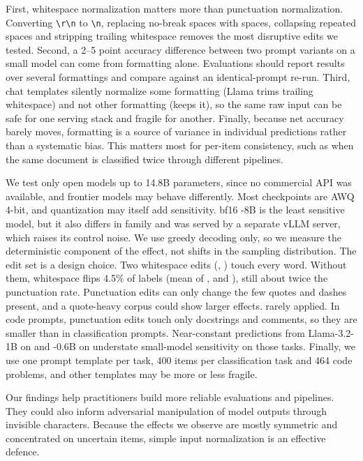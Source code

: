 First, whitespace normalization matters more than punctuation normalization. Converting \texttt{\textbackslash r\textbackslash n} to \texttt{\textbackslash n}, replacing no-break spaces with spaces, collapsing repeated spaces and stripping trailing whitespace removes the most disruptive edits we tested.
Second, a 2--5 point accuracy difference between two prompt variants on a small model can come from formatting alone. Evaluations should report results over several formattings and compare against an identical-prompt re-run.
Third, chat templates silently normalize some formatting (Llama trims trailing whitespace) and not other formatting (\qwentwo keeps it), so the same raw input can be safe for one serving stack and fragile for another.
Finally, because net accuracy barely moves, formatting is a source of variance in individual predictions rather than a systematic bias. This matters most for per-item consistency, such as when the same document is classified twice through different pipelines.

We test only open models up to 14.8B parameters, since no commercial API was available, and frontier models may behave differently.
Most checkpoints are AWQ 4-bit, and quantization may itself add sensitivity. bf16 \qwenthree-8B is the least sensitive model, but it also differs in family and was served by a separate vLLM server, which raises its control noise.
We use greedy decoding only, so we measure the deterministic component of the effect, not shifts in the sampling distribution.
The edit set is a design choice. Two whitespace edits (, ) touch every word. Without them, whitespace flips 4.5\% of labels (mean of ,  and ), still about twice the punctuation rate.
Punctuation edits can only change the few quotes and dashes present, and a quote-heavy corpus could show larger effects.  rarely applied.
In code prompts, punctuation edits touch only docstrings and comments, so they are smaller than in classification prompts.
Near-constant predictions from Llama-3.2-1B on \boolq and \qwenthree-0.6B on \agnews understate small-model sensitivity on those tasks.
Finally, we use one prompt template per task, 400 items per classification task and 464 code problems, and other templates may be more or less fragile.

Our findings help practitioners build more reliable evaluations and pipelines. They could also inform adversarial manipulation of model outputs through invisible characters.
Because the effects we observe are mostly symmetric and concentrated on uncertain items, simple input normalization is an effective defence.
